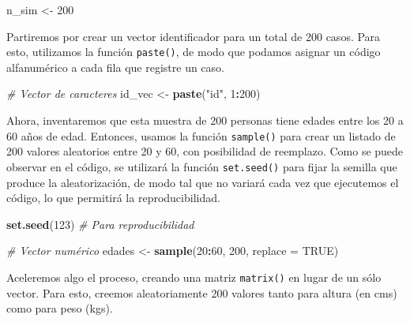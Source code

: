 \documentclass[
]{book}
\newenvironment{Shaded}{\begin{snugshade}}{\end{snugshade}}
\newcommand{\AttributeTok}[1]{\textcolor[rgb]{0.13,0.29,0.53}{#1}}
\newcommand{\CommentTok}[1]{\textcolor[rgb]{0.56,0.35,0.01}{\textit{#1}}}
\newcommand{\ConstantTok}[1]{\textcolor[rgb]{0.56,0.35,0.01}{#1}}
\newcommand{\DecValTok}[1]{\textcolor[rgb]{0.00,0.00,0.81}{#1}}
\newcommand{\FunctionTok}[1]{\textcolor[rgb]{0.13,0.29,0.53}{\textbf{#1}}}
\newcommand{\NormalTok}[1]{#1}
\newcommand{\OtherTok}[1]{\textcolor[rgb]{0.56,0.35,0.01}{#1}}
\newcommand{\SpecialCharTok}[1]{\textcolor[rgb]{0.81,0.36,0.00}{\textbf{#1}}}
\newcommand{\StringTok}[1]{\textcolor[rgb]{0.31,0.60,0.02}{#1}}
\begin{document}
\begin{Shaded}
\begin{Highlighting}[]
\NormalTok{n\_sim }\OtherTok{\textless{}{-}} \DecValTok{200}
\end{Highlighting}
\end{Shaded}

Partiremos por crear un vector identificador para un total de 200 casos. Para esto, utilizamos la función \texttt{paste()}, de modo que podamos asignar un código alfanumérico a cada fila que registre un caso.

\begin{Shaded}
\begin{Highlighting}[]
\CommentTok{\# Vector de caracteres}
\NormalTok{id\_vec }\OtherTok{\textless{}{-}} \FunctionTok{paste}\NormalTok{(}\StringTok{"id"}\NormalTok{, }\DecValTok{1}\SpecialCharTok{:}\DecValTok{200}\NormalTok{)}
\end{Highlighting}
\end{Shaded}

Ahora, inventaremos que esta muestra de 200 personas tiene edades entre los 20 a 60 años de edad. Entonces, usamos la función \texttt{sample()} para crear un listado de 200 valores aleatorios entre 20 y 60, con posibilidad de reemplazo. Como se puede observar en el código, se utilizará la función \texttt{set.seed()} para fijar la semilla que produce la aleatorización, de modo tal que no variará cada vez que ejecutemos el código, lo que permitirá la reproducibilidad.

\begin{Shaded}
\begin{Highlighting}[]
\FunctionTok{set.seed}\NormalTok{(}\DecValTok{123}\NormalTok{)  }\CommentTok{\# Para reproducibilidad}

\CommentTok{\# Vector numérico}
\NormalTok{edades }\OtherTok{\textless{}{-}} \FunctionTok{sample}\NormalTok{(}\DecValTok{20}\SpecialCharTok{:}\DecValTok{60}\NormalTok{, }\DecValTok{200}\NormalTok{, }\AttributeTok{replace =} \ConstantTok{TRUE}\NormalTok{)}
\end{Highlighting}
\end{Shaded}

Aceleremos algo el proceso, creando una matriz \texttt{matrix()} en lugar de un sólo vector. Para esto, creemos aleatoriamente 200 valores tanto para altura (en cms) como para peso (kgs).
\end{document}
